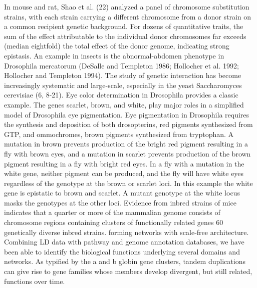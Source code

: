 In mouse and rat, Shao et al. (22) analyzed a panel of chromosome substitution strains, with each strain carrying a different chromosome from a donor strain on a common recipient genetic background. For dozens of quantitative traits, the sum of the effect attributable to the individual donor chromosomes far exceeds (median eightfold) the total effect of the donor genome, indicating strong epistasis.  \cite{zuk2012mystery}
An example in insects is the abnormal-abdomen phenotype in Drosophila mercatorum (DeSalle and Templeton 1986; Hollocher et al. 1992; Hollocher and Templeton 1994). \cite{culverhouse2002perspective}
The study of genetic interaction has become increasingly systematic and large-scale, especially in the yeast Saccharomyces cerevisiae (6, 8-21). \cite{mani2008defining}
Eye color determination in Drosophila provides a classic example. The genes scarlet, brown, and white, play major roles in a simplified model of Drosophila eye pigmentation. Eye pigmentation in Drosophila requires the synthesis and deposition of both drosopterins, red pigments synthesized from GTP, and ommochromes, brown pigments synthesized from tryptophan. A mutation in brown prevents production of the bright red pigment resulting in a fly with brown eyes, and a mutation in scarlet prevents production of the brown pigment resulting in a fly with bright red eyes. In a fly with a mutation in the white gene, neither pigment can be produced, and the fly will have white eyes regardless of the genotype at the brown or scarlet loci. In this example the white gene is epistatic to brown and scarlet. A mutant genotype at the white locus masks the genotypes at the other loci. \cite{tyler2009shadows}
Evidence from inbred strains of mice indicates that a quarter or more of the mammalian genome consists of chromosome regions containing clusters of functionally related genes \cite{petkov2005evidence}
60 genetically diverse inbred strains. \cite{petkov2005evidence}
forming networks with scale-free architecture. Combining LD data with pathway and genome annotation databases, we have been able to identify the biological functions underlying several domains and networks. \cite{petkov2005evidence}
As typified by the a and b globin gene clusters, tandem duplications can give rise to gene families whose members develop divergent, but still related, functions over time.  \cite{petkov2005evidence}


